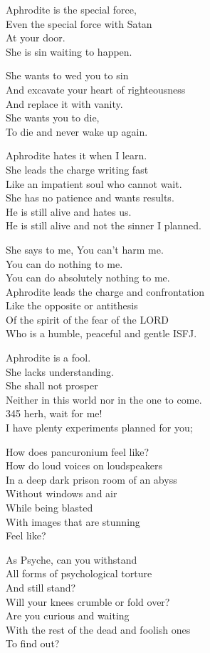 \documentclass[
]{book}
\begin{document}
Aphrodite is the special force,\\
Even the special force with Satan\\
At your door.\\
She is sin waiting to happen.

She wants to wed you to sin\\
And excavate your heart of righteousness\\
And replace it with vanity.\\
She wants you to die,\\
To die and never wake up again.

Aphrodite hates it when I learn.\\
She leads the charge writing fast\\
Like an impatient soul who cannot wait.\\
She has no patience and wants results.\\
He is still alive and hates us.\\
He is still alive and not the sinner I planned.

She says to me, You can't harm me.\\
You can do nothing to me.\\
You can do absolutely nothing to me.\\
Aphrodite leads the charge and confrontation\\
Like the opposite or antithesis\\
Of the spirit of the fear of the LORD\\
Who is a humble, peaceful and gentle ISFJ.

Aphrodite is a fool.\\
She lacks understanding.\\
She shall not prosper\\
Neither in this world nor in the one to come.\\
345 herh, wait for me!\\
I have plenty experiments planned for you;

How does pancuronium feel like?\\
How do loud voices on loudspeakers\\
In a deep dark prison room of an abyss\\
Without windows and air\\
While being blasted\\
With images that are stunning\\
Feel like?

As Psyche, can you withstand\\
All forms of psychological torture\\
And still stand?\\
Will your knees crumble or fold over?\\
Are you curious and waiting\\
With the rest of the dead and foolish ones\\
To find out?
\end{document}
